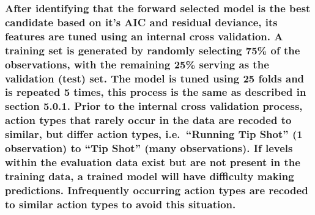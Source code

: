 \documentclass[american,]{article}
\begin{document}
\hypertarget{after-identifying-that-the-forward-selected-model-is-the-best-candidate-based-on-its-aic-and-residual-deviance-its-features-are-tuned-using-an-internal-cross-validation.-a-training-set-is-generated-by-randomly-selecting-75-of-the-observations-with-the-remaining-25-serving-as-the-validation-test-set.-the-model-is-tuned-using-25-folds-and-is-repeated-5-times-this-process-is-the-same-as-described-in-section-5.0.1.-prior-to-the-internal-cross-validation-process-action-types-that-rarely-occur-in-the-data-are-recoded-to-similar-but-differ-action-types-i.e.-running-tip-shot-1-observation-to-tip-shot-many-observations.-if-levels-within-the-evaluation-data-exist-but-are-not-present-in-the-training-data-a-trained-model-will-have-difficulty-making-predictions.-infrequently-occurring-action-types-are-recoded-to-similar-action-types-to-avoid-this-situation.}{%
\subsubsection{After identifying that the forward selected model is the best candidate based on it's AIC and residual deviance, its features are tuned using an internal cross validation. A training set is generated by randomly selecting 75\% of the observations, with the remaining 25\% serving as the validation (test) set. The model is tuned using 25 folds and is repeated 5 times, this process is the same as described in section 5.0.1. Prior to the internal cross validation process, action types that rarely occur in the data are recoded to similar, but differ action types, i.e.~``Running Tip Shot'' (1 observation) to ``Tip Shot'' (many observations). If levels within the evaluation data exist but are not present in the training data, a trained model will have difficulty making predictions. Infrequently occurring action types are recoded to similar action types to avoid this situation.}\label{after-identifying-that-the-forward-selected-model-is-the-best-candidate-based-on-its-aic-and-residual-deviance-its-features-are-tuned-using-an-internal-cross-validation.-a-training-set-is-generated-by-randomly-selecting-75-of-the-observations-with-the-remaining-25-serving-as-the-validation-test-set.-the-model-is-tuned-using-25-folds-and-is-repeated-5-times-this-process-is-the-same-as-described-in-section-5.0.1.-prior-to-the-internal-cross-validation-process-action-types-that-rarely-occur-in-the-data-are-recoded-to-similar-but-differ-action-types-i.e.-running-tip-shot-1-observation-to-tip-shot-many-observations.-if-levels-within-the-evaluation-data-exist-but-are-not-present-in-the-training-data-a-trained-model-will-have-difficulty-making-predictions.-infrequently-occurring-action-types-are-recoded-to-similar-action-types-to-avoid-this-situation.}}
\end{document}
